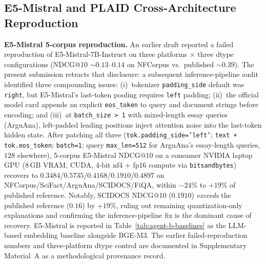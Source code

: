 \documentclass[review,1p]{elsarticle}
\begin{document}
\subsection{E5-Mistral and PLAID Cross-Architecture Reproduction}
\label{subsec:e5-failed-reproduction}
\label{subsec:e5-disclosure}
\label{subsec:reproducibility-notes}

\textbf{E5-Mistral 5-corpus reproduction.} An earlier draft reported a failed reproduction of E5-Mistral-7B-Instruct on three platforms $\times$ three dtype configurations (NDCG@10 $\sim 0.13$--$0.14$ on NFCorpus vs.\ published $\sim 0.39$). The present submission retracts that disclosure: a subsequent inference-pipeline audit identified three compounding issues: (i)~tokenizer \texttt{padding\_side} default was \texttt{right}, but E5-Mistral's last-token pooling requires \texttt{left} padding; (ii)~the official model card appends an explicit \texttt{eos\_token} to query and document strings before encoding; and (iii)~at \texttt{batch\_size > 1} with mixed-length essay queries (ArguAna), left-padded leading positions inject attention noise into the last-token hidden state. After patching all three (\texttt{tok.padding\_side='left'}; \texttt{text + tok.eos\_token}; \texttt{batch=1}; query \texttt{max\_len=512} for ArguAna's essay-length queries, $128$ elsewhere), 5-corpus E5-Mistral NDCG@10 on a consumer NVIDIA laptop GPU (8\,GB VRAM, CUDA, 4-bit nf4 + fp16 compute via \texttt{bitsandbytes}) recovers to $0.3484$/$0.5735$/$0.4168$/$0.1910$/$0.4897$ on NFCorpus/SciFact/ArguAna/SCIDOCS/FiQA, within $-24\%$ to $+19\%$ of published reference. Notably, SCIDOCS NDCG@10 ($0.1910$) \emph{exceeds} the published reference ($0.16$) by $+19\%$, ruling out remaining quantization-only explanations and confirming the inference-pipeline fix is the dominant cause of recovery. E5-Mistral is reported in Table~\ref{tab:agent-b-baselines} as the LLM-based embedding baseline alongside BGE-M3. The earlier failed-reproduction numbers and three-platform dtype control are documented in Supplementary Material~A as a methodological provenance record.
\end{document}
